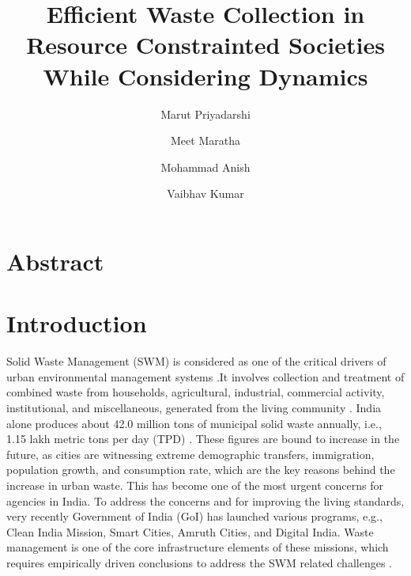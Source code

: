 \documentclass[12pt]{article}
\begin{document}
\title{Efficient Waste Collection in Resource Constrainted Societies While Considering Dynamics}
\date{}
\author[1]{Marut Priyadarshi}
\author[1]{Meet Maratha}
\author[2]{Mohammad Anish}
\author[1*]{Vaibhav Kumar}
\maketitle
\section{Abstract}
\pagebreak
\section{Introduction}

Solid Waste Management (SWM) is considered as one of the critical drivers of urban environmental management systems \parencite{hoornweg2012waste}.It involves collection and treatment of combined waste from households, agricultural, industrial, commercial activity, institutional, and miscellaneous, generated from the living community \parencite{GUPTA2015206}. India alone produces about 42.0 million tons of municipal solid waste annually, i.e., 1.15 lakh metric tons per day (TPD) \parencite{SHARMA2021293,GUPTA2015206}. These figures are bound to increase in the future, as cities are witnessing extreme demographic transfers, immigration, population growth, and consumption rate, which are the key reasons behind the increase in urban waste. This has become one of the most urgent concerns for agencies in India. To address the concerns and for improving the living standards, very recently Government of India (GoI) has launched various programs, e.g., Clean India Mission, Smart Cities, Amruth Cities, and Digital India. Waste management is one of the core infrastructure elements of these missions, which requires empirically driven conclusions to address the SWM related challenges \parencite{CHEELA2021419}. 
\end{document}
